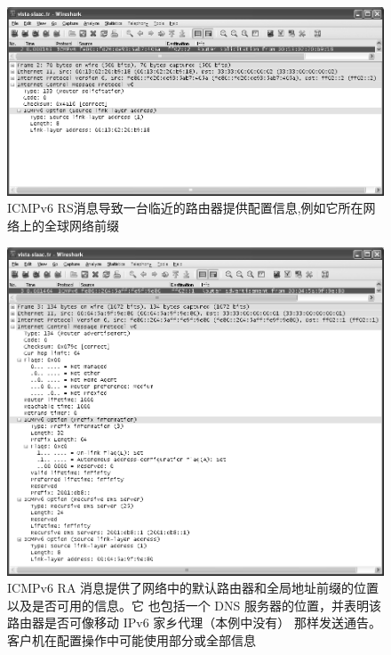 \begin{figure}[H]
    \centering
	\includegraphics[scale=0.5]{imgs/6/6-24.png}
	\caption{ ICMPv6 RS消息导致一台临近的路由器提供配置信息,例如它所在网络上的全球网络前缀}
\end{figure}

\begin{figure}[H]
    \centering
	\includegraphics[scale=0.5]{imgs/6/6-25.png}
	\caption{ICMPv6 RA 消息提供了网络中的默认路由器和全局地址前缀的位置以及是否可用的信息。它
    也包括一个 DNS 服务器的位置，并表明该路由器是否可像移动 IPv6 家乡代理（本例中没有）
    那样发送通告。客户机在配置操作中可能使用部分或全部信息}
\end{figure}


